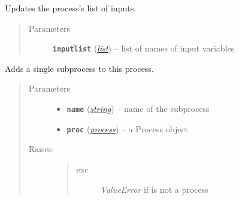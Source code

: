\documentclass[letterpaper,10pt,english]{sphinxmanual}
\begin{document}
\begin{fulllineitems}
\begin{fulllineitems}
\label{api/climlab.process:climlab.process.process.Process.add_input}
Updates the process's list of inputs.
\begin{quote}\begin{description}
\item[{Parameters}] \leavevmode
\textbf{\texttt{inputlist}} (\href{http://docs.python.org/2.7/library/functions.html\#list}{\emph{list}}) -- list of names of input variables

\end{description}\end{quote}

\end{fulllineitems}


\begin{fulllineitems}
\label{api/climlab.process:climlab.process.process.Process.add_subprocess}
Adds a single subprocess to this process.
\begin{quote}\begin{description}
\item[{Parameters}] \leavevmode\begin{itemize}
\item {} 
\textbf{\texttt{name}} (\href{http://docs.python.org/2.7/library/string.html\#module-string}{\emph{string}}) -- name of the subprocess

\item {} 
\textbf{\texttt{proc}} ({\hyperref[api/climlab.process:module-climlab.process.process]{\emph{\emph{process}}}}) -- a Process object

\end{itemize}

\item[{Raises}] \leavevmode\begin{quote}\begin{description}
\item[{exc}] \leavevmode
\emph{ValueError} if  is not a process

\end{description}\end{quote}

\end{description}\end{quote}


\end{fulllineitems}
\end{fulllineitems}
\end{document}
